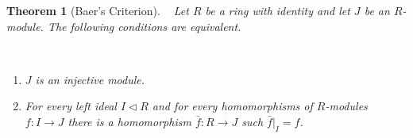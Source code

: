 \documentclass[12pt, letterpaper, oneside]{article}
\theoremstyle{plain}
\newtheorem{theorem}{Theorem}[section]
\theoremstyle{definition}
\newcommand{\benu}{\begin{enumerate}}
\newcommand{\eenu}{\end{enumerate}}
\newcommand{\vs}{\vskip 5mm}
\newcommand{\isep}[1][0]{\setlength{\itemsep}{#1 mm}}
\begin{document}
\vs\vs

\begin{theorem}[Baer's Criterion] \ \newline
\label{THM_BAERCRIT}
Let $R$ be a ring with identity and let $J$ be an $R$-module. 
The following conditions are equivalent.


\vskip -13mm

\ 
\benu
\isep[5]
\item $J$ is an injective module.
\item For every left ideal $I\lhd R$ 
and for every homomorphisms of $R$-modules $f\colon I \to J$ there is a homomorphism 
$\bar{f}\colon R \to J $ such $\bar{f}|_{I} = f$.
\eenu


\end{theorem}

\vs
\end{document}
